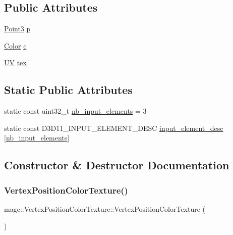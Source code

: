 \subsection*{Public Attributes}
\begin{DoxyCompactItemize}
\item 
\hyperlink{structmage_1_1_point3}{Point3} \hyperlink{structmage_1_1_vertex_position_color_texture_a145c2e2fce90b07252b778b46e31ea24}{p}
\item 
\hyperlink{structmage_1_1_color}{Color} \hyperlink{structmage_1_1_vertex_position_color_texture_afb9ec100ec42e83e501448d4bb0ee4f8}{c}
\item 
\hyperlink{structmage_1_1_u_v}{UV} \hyperlink{structmage_1_1_vertex_position_color_texture_adfbaa105e46bb65f502ec33eaa2e8b15}{tex}
\end{DoxyCompactItemize}
\subsection*{Static Public Attributes}
\begin{DoxyCompactItemize}
\item 
static const uint32\+\_\+t \hyperlink{structmage_1_1_vertex_position_color_texture_a435a9387a5dda4fb5aff9b9b3f11e736}{nb\+\_\+input\+\_\+elements} = 3
\item 
static const D3\+D11\+\_\+\+I\+N\+P\+U\+T\+\_\+\+E\+L\+E\+M\+E\+N\+T\+\_\+\+D\+E\+SC \hyperlink{structmage_1_1_vertex_position_color_texture_a4be64221f4ae8e2bf37bb83fb59f2f0c}{input\+\_\+element\+\_\+desc} \mbox{[}\hyperlink{structmage_1_1_vertex_position_color_texture_a435a9387a5dda4fb5aff9b9b3f11e736}{nb\+\_\+input\+\_\+elements}\mbox{]}
\end{DoxyCompactItemize}


\subsection{Constructor \& Destructor Documentation}
\hypertarget{structmage_1_1_vertex_position_color_texture_a49020fb0c115c3dc3c94471fcbc30a82}{}\label{structmage_1_1_vertex_position_color_texture_a49020fb0c115c3dc3c94471fcbc30a82} 
\subsubsection{\texorpdfstring{Vertex\+Position\+Color\+Texture()}{VertexPositionColorTexture()}\hspace{0.1cm}{\footnotesize\ttfamily [1/4]}}
{\footnotesize\ttfamily mage\+::\+Vertex\+Position\+Color\+Texture\+::\+Vertex\+Position\+Color\+Texture (\begin{DoxyParamCaption}{ }\end{DoxyParamCaption})\hspace{0.3cm}{\ttfamily [default]}}

